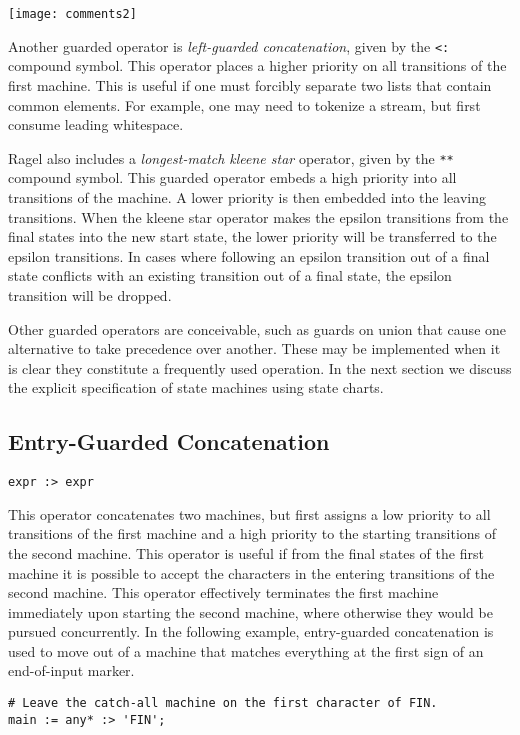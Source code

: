 \documentclass[letterpaper,11pt,oneside]{book}
\newcommand{\verbspace}{\vspace{10pt}}
\newcommand{\graphspace}{\vspace{10pt}}
\newenvironment{inline_code}{\def\baselinestretch{1}\vspace{12pt}\small}{}
\begin{document}
\graphspace
\begin{center}
\texttt{[image: comments2]}
\end{center}
\graphspace

Another guarded operator is {\em left-guarded concatenation}, given by the
\verb|<:| compound symbol. This operator places a higher priority on all
transitions of the first machine. This is useful if one must forcibly separate
two lists that contain common elements. For example, one may need to tokenize a
stream, but first consume leading whitespace.

Ragel also includes a {\em longest-match kleene star} operator, given by the
\verb|**| compound symbol. This 
guarded operator embeds a high
priority into all transitions of the machine. 
A lower priority is then embedded into the leaving transitions.  When the
kleene star operator makes the epsilon transitions from
the final states into the new start state, the lower priority will be transferred
to the epsilon transitions. In cases where following an epsilon transition
out of a final state conflicts with an existing transition out of a final
state, the epsilon transition will be dropped.

Other guarded operators are conceivable, such as guards on union that cause one
alternative to take precedence over another. These may be implemented when it
is clear they constitute a frequently used operation.
In the next section we discuss the explicit specification of state machines
using state charts.

\subsection{Entry-Guarded Concatenation}

\verb|expr :> expr| 

This operator concatenates two machines, but first assigns a low
priority to all transitions
of the first machine and a high priority to the starting transitions of the
second machine. This operator is useful if from the final states of the first
machine it is possible to accept the characters in the entering transitions of
the second machine. This operator effectively terminates the first machine
immediately upon starting the second machine, where otherwise they would be
pursued concurrently. In the following example, entry-guarded concatenation is
used to move out of a machine that matches everything at the first sign of an
end-of-input marker.

\begin{inline_code}
\begin{verbatim}
# Leave the catch-all machine on the first character of FIN.
main := any* :> 'FIN';
\end{verbatim}
\end{inline_code}
\verbspace
\end{document}
